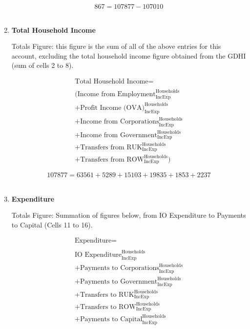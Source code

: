 \begin{enumerate}
\begin{equation} \nonumber
867 = 107877-107010
\end{equation}\\

\newpage


\item \textbf {Total Household Income}

Totals Figure: this figure is the sum of all of the above entries for this account, excluding the total household income figure obtained from the GDHI (sum of cells 2 to 8).

\begin{equation}
\begin{split}
\text{Total Household Income} =  \\ \\
(\text{Income from Employment}^\text{Households}_\text{IncExp}\\
+\text{Profit Income (OVA)}^\text{Households}_\text{IncExp}\\
+\text{Income from Corporations}^\text{Households}_\text{IncExp}\\
+\text{Income from Government}^\text{Households}_\text{IncExp}\\
+\text{Transfers from RUK}^\text{Households}_\text{IncExp}\\
+\text{Transfers from ROW}^\text{Households}_\text{IncExp})
\end{split} \label{eq:2.5.13}
\end{equation}

\begin{equation} \nonumber
107877 = 63561+5289+15103+19835+1853+2237
\end{equation}\\


\item \textbf {Expenditure}

Totals Figure: Summation of figures below, from IO Expenditure to Payments to Capital (Cells 11 to 16).

\begin{equation}
\begin{split}
\text{Expenditure} =  \\ \\
\text{IO Expenditure}^\text{Households}_\text{IncExp}\\
+\text{Payments to Corporations}^\text{Households}_\text{IncExp}\\
+\text{Payments to Government}^\text{Households}_\text{IncExp}\\
+\text{Transfers to RUK}^\text{Households}_\text{IncExp}\\
+\text{Transfers to ROW}^\text{Households}_\text{IncExp}\\
+\text{Payments to Capital}^\text{Households}_\text{IncExp}
\end{split} \label{eq:2.5.14}
\end{equation}


\end{enumerate}
